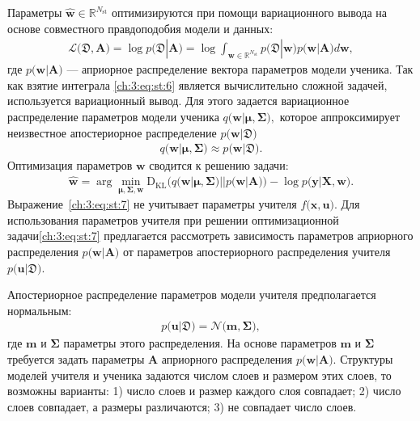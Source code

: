 \documentclass{dissert}
\begin{document}
Параметры $\hat{\mathbf{w}} \in \mathbb{R}^{N_{\text{st}}}$ оптимизируются при помощи вариационного вывода на основе совместного правдоподобия модели и данных:
\[
\label{ch:3:eq:st:6}
\begin{aligned}
\mathcal{L}\bigr(\mathfrak{D}, \mathbf{A}\bigr) = \log p\bigr(\mathfrak{D}|\mathbf{A}\bigr) = \log \int_{\mathbf{w} \in \mathbb{R}^{N_{\text{st}}}}p\bigr(\mathfrak{D}|\mathbf{w}\bigr)p\bigr(\mathbf{w}|\mathbf{A}\bigr)d\mathbf{w},
\end{aligned}
\]
где $p\bigr(\mathbf{w}| \mathbf{A}\bigr)$ --- априорное распределение вектора параметров модели ученика.
Так как взятие интеграла \eqref{ch:3:eq:st:6} является вычислительно сложной задачей, используется вариационный вывод. Для этого задается вариационное распределение параметров модели ученика $q\bigr(\mathbf{w}|\bm{\mu}, \bm{\Sigma}\bigr),$ которое аппроксимирует неизвестное апостериорное распределение $p\bigr(\mathbf{w}|\mathfrak{D}\bigr)$
\[
\label{ch:3:eq:st:new:1}
\begin{aligned}
q\bigr(\mathbf{w}|\bm{\mu}, \bm{\Sigma}\bigr) \approx  p\bigr(\mathbf{w}|\mathfrak{D}\bigr).
\end{aligned}
\]
Оптимизация параметров $\mathbf{w}$ сводится к решению  задачи:
\[
\label{ch:3:eq:st:7}
\begin{aligned}
\hat{\mathbf{w}} = \arg \min_{\bm{\mu}, \bm{\Sigma}, \mathbf{w}} \text{D}_{\text{KL}}\bigr(q\bigr(\mathbf{w}|\bm{\mu}, \bm{\Sigma}\bigr)||p\bigr(\mathbf{w}|\mathbf{A}\bigr)\bigr) - \log p\bigr(\mathbf{y}|\mathbf{X}, \mathbf{w}\bigr).
\end{aligned}
\]
Выражение~\eqref{ch:3:eq:st:7} не учитывает параметры учителя $f\bigr(\mathbf{x}, \mathbf{u}\bigr)$. Для использования параметров учителя при решении оптимизационной задачи\eqref{ch:3:eq:st:7} предлагается рассмотреть зависимость параметров априорного распределения $p\bigr(\mathbf{w}|\mathbf{A}\bigr)$ от параметров апостериорного распределения учителя $p\bigr(\mathbf{u}|\mathfrak{D}\bigr)$.

Апостериорное распределение параметров модели учителя предполагается нормальным:
\[
\label{ch:3:eq:ap:1}
\begin{aligned}
p\bigr(\mathbf{u}|\mathfrak{D}\bigr) = \mathcal{N}\bigr(\mathbf{m}, \bm{\Sigma}\bigr),
\end{aligned}
\]
где $\mathbf{m}$ и $\bm{\Sigma}$ параметры этого распределения. На основе параметров $\mathbf{m}$ и $\bm{\Sigma}$ требуется задать параметры $\mathbf{A}$ априорного распределения $p\bigr(\mathbf{w}|\mathbf{A}\bigr).$
Структуры моделей учителя и ученика задаются числом слоев и размером этих слоев, то возможны варианты: 1) число слоев и размер каждого слоя совпадает; 2) число слоев совпадает, а размеры различаются; 3) не совпадает число слоев.
\end{document}
